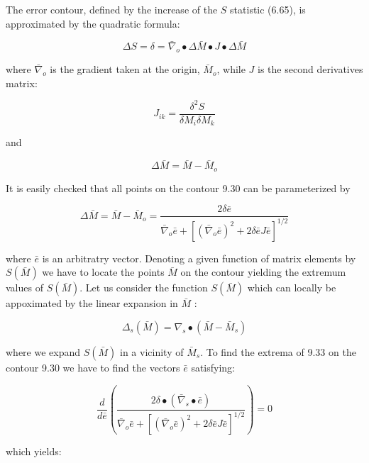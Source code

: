 \documentclass[10pt]{article}
\begin{document}
The error contour, defined by the increase of the $S$ statistic (6.65), is approximated by the quadratic formula:


\begin{equation*}
\Delta S=\delta=\bar{\nabla}_{o} \bullet \Delta \bar{M} \bullet J \bullet \Delta \bar{M} \tag{9.30}
\end{equation*}


where $\bar{\nabla}_{o}$ is the gradient taken at the origin, $\bar{M}_{o}$, while $J$ is the second derivatives matrix:


\begin{equation*}
J_{i k}=\frac{\delta^{2} S}{\delta M_{i} \delta M_{k}} \tag{9.31}
\end{equation*}


and

$$
\Delta \bar{M}=\bar{M}-\bar{M}_{o}
$$

It is easily checked that all points on the contour 9.30 can be parameterized by


\begin{equation*}
\Delta \bar{M}=\bar{M}-\bar{M}_{o}=\frac{2 \delta \bar{e}}{\bar{\nabla}_{o} \bar{e}+\left[\left(\bar{\nabla}_{o} \bar{e}\right)^{2}+2 \delta \bar{e} J \bar{e}\right]^{1 / 2}} \tag{9.32}
\end{equation*}


where $\bar{e}$ is an arbitratry vector. Denoting a given function of matrix elements by $S(\bar{M})$ we have to locate the points $\bar{M}$ on the contour yielding the extremum values of $S(\bar{M})$. Let us consider the function $S(\bar{M})$ which can locally be appoximated by the linear expansion in $\bar{M}$ :


\begin{equation*}
\Delta_{s}(\bar{M})=\nabla_{s} \bullet\left(\bar{M}-\bar{M}_{s}\right) \tag{9.33}
\end{equation*}


where we expand $S(\bar{M})$ in a vicinity of $\bar{M}_{s}$. To find the extrema of 9.33 on the contour 9.30 we have to find the vectors $\bar{e}$ satisfying:


\begin{equation*}
\frac{d}{d \bar{e}}\left(\frac{2 \delta \bullet\left(\bar{\nabla}_{s} \bullet \bar{e}\right)}{\bar{\nabla}_{o} \bar{e}+\left[\left(\bar{\nabla}_{o} \bar{e}\right)^{2}+2 \delta \bar{e} J \bar{e}\right]^{1 / 2}}\right)=0 \tag{9.34}
\end{equation*}


which yields:
\end{document}
